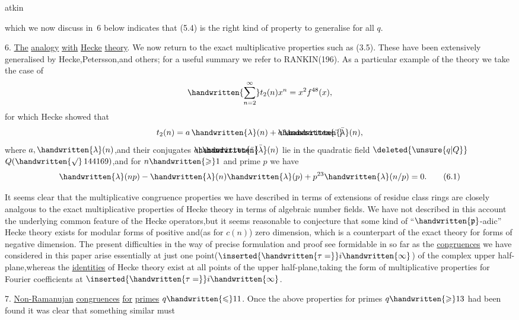 \begin{flushright}
atkin 
\end{flushright}

\noindent which we now discuss  in \handwritten{\S}\,6 below indicates that (5.4) is the right kind of property to generalise for all \uline{$q$}.

6. \uline{The} \uline{analogy} \uline{with} \uline{Hecke} \uline{theory}. We now return to the exact multiplicative properties such as (3.5). These have been extensively generalised by Hecke,Petersson,and others; for a useful summary we refer to RANKIN(196\hspace{.6em}). As a particular example of the theory we take the case of
\[
\handwritten{\sum_{n=2}^{\infty}}t_{2}(n)x^{n}=x^{2}f^{48}(x),
\]
for which Hecke showed that
\[
t_{2}(n)=a\,\handwritten{\lambda}(n)+\mathord{\rlap{$\handwritten{\bar{\phantom{a}}}$}a}\,\handwritten{\bar{\lambda}}(n),
\]
where $a,\handwritten{\lambda}(n)$,and their conjugates $\mathord{\rlap{$\handwritten{\bar{\phantom{a}}}$}a},\handwritten{\bar{\lambda}}(n)$ lie in the quadratic field $\deleted{\unsure{q|Q}}$\reversemarginpar{} $Q(\handwritten{\surd}\,144169)$,and for $n\handwritten{\geqslant}1$ and prime $p$ we have
\[
\handwritten{\lambda}(np)-\handwritten{\lambda}(n)\handwritten{\lambda}(p)+p^{23}\handwritten{\lambda}(n/p)=0.
\tag*{(6.1)}
\]

It seems clear that the multiplicative congruence properties we have described in terms of extensions of residue class rings are closely analgous to the exact multiplicative properties of Hecke theory in terms of algebraic number fields. We have not described in this account the underlying common feature of the Hecke operators,but it seems reasonable to conjecture that some kind of ``$\handwritten{\mathfrak{p}}$-adic'' Hecke theory\normalmarginpar{} exists for modular forms of positive and(as for $c(n)$) zero dimension, which is a counterpart of the exact theory for forms of negative dimension. The present difficulties in the way of precise formulation and proof see formidable in so far as the \uline{congruences} we have considered in this paper arise essentially at just one point($\inserted{\handwritten{\tau=}}i\handwritten{\infty}$) of the complex upper half-plane,whereas the \uline{identities} of Hecke theory exist at all points of the upper half-plane,taking the form of multiplicative properties for Fourier coefficients at $\inserted{\handwritten{\tau=}}i\handwritten{\infty}$.

7. \uline{Non-Ramanujan} \uline{congruences} \uline{for} \uline{primes} $q\handwritten{\leqslant}11$. Once the above properties for primes $q\handwritten{\geqslant}13$ had been found it was clear that something similar must
